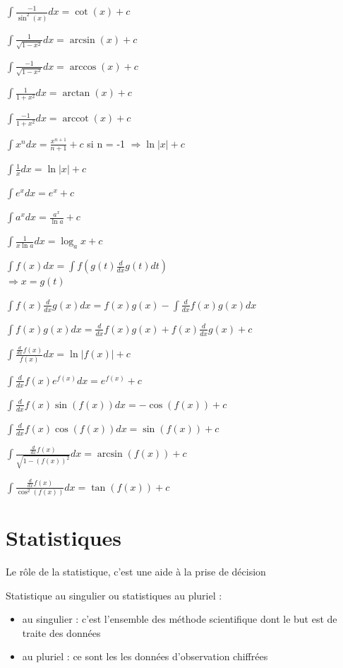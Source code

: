 \documentclass[a4paper,12pt]{article}
\newcommand\tab[1][]{\hspace*{#1}}
\DeclareMathOperator{\arccot}{arccot}
\begin{document}
$\int{\frac{-1}{\sin^2(x)} dx} = \cot(x) +c$

$\int{\frac{1}{\sqrt{1-x^2} } dx} = \arcsin(x) +c$

$\int{\frac{-1}{\sqrt{1-x^2} } dx} = \arccos(x) +c$

$\int{\frac{1}{1+x^2} dx} = \arctan(x) +c$

$\int{\frac{-1}{1+x^2} dx} = \arccot(x) +c$

$\int{x^n dx} = \frac{x^{n+1}}{n+1} +c$
\tab[1cm] si n = -1 $\Rightarrow \ln \left|x\right| +c$

$\int{\frac{1}{x} dx} = \ln \left|x\right| +c$

$\int{e^x dx} = e^x+c$

$\int{a^x dx} = \frac{a^x}{\ln a} +c$

$\int{\frac{1}{x \ln a}  dx} = \log_a x +c$

$\int{f(x) dx} =\int{f(g(t)\frac{d}{dx} g(t)dt)}$\\
\tab[1.8cm]$\Rightarrow x = g(t)$

$\int{f(x) \frac{d}{dx} g(x) dx} = f(x)g(x)-\int{\frac{d}{dx} f(x)g(x) dx}$

$\int{f(x)g(x) dx} = \frac{d}{dx} f(x)g(x) + f(x)\frac{d}{dx} g(x)+c$

$\int{\frac{\frac{d}{dx} f(x)}{f(x)}  dx} = \ln \left|f(x)\right| +c$

$\int{\frac{d}{dx} f(x) e^{f(x)} dx} = e^{f(x)}+c$

$\int{\frac{d}{dx} f(x)\sin(f(x)) dx} = -\cos(f(x)) +c$

$\int{\frac{d}{dx} f(x)\cos(f(x)) dx} = \sin(f(x)) +c$

$\int{\frac{\frac{d}{dx} f(x)}{\sqrt{1-(f(x))^2} }  dx} = \arcsin(f(x)) +c$

$\int{\frac{\frac{d}{dx} f(x)}{\cos^2(f(x))}  dx} = \tan(f(x))+c$

\newpage
\section{Statistiques}

Le rôle de la statistique, c'est une aide à la prise de décision

Statistique au singulier ou statistiques au pluriel : 
\begin{itemize}%
    \item au singulier : c'est l'ensemble des méthode scientifique dont le but est de traite des données 
    \item au pluriel : ce sont les les données d'observation chiffrées 
\end{itemize}
\end{document}
